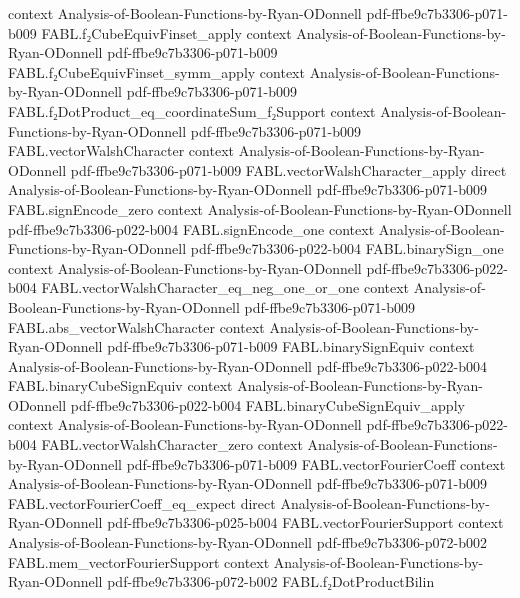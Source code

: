 \begin{theorem}
  {context}
  {Analysis-of-Boolean-Functions-by-Ryan-ODonnell}
  {pdf-ffbe9c7b3306-p071-b009}
\proofstep
  {FABL.f₂CubeEquivFinset_apply}
  {context}
  {Analysis-of-Boolean-Functions-by-Ryan-ODonnell}
  {pdf-ffbe9c7b3306-p071-b009}
\proofstep
  {FABL.f₂CubeEquivFinset_symm_apply}
  {context}
  {Analysis-of-Boolean-Functions-by-Ryan-ODonnell}
  {pdf-ffbe9c7b3306-p071-b009}
\proofstep
  {FABL.f₂DotProduct_eq_coordinateSum_f₂Support}
  {context}
  {Analysis-of-Boolean-Functions-by-Ryan-ODonnell}
  {pdf-ffbe9c7b3306-p071-b009}
\proofstep
  {FABL.vectorWalshCharacter}
  {context}
  {Analysis-of-Boolean-Functions-by-Ryan-ODonnell}
  {pdf-ffbe9c7b3306-p071-b009}
\proofstep
  {FABL.vectorWalshCharacter_apply}
  {direct}
  {Analysis-of-Boolean-Functions-by-Ryan-ODonnell}
  {pdf-ffbe9c7b3306-p071-b009}
\proofstep
  {FABL.signEncode_zero}
  {context}
  {Analysis-of-Boolean-Functions-by-Ryan-ODonnell}
  {pdf-ffbe9c7b3306-p022-b004}
\proofstep
  {FABL.signEncode_one}
  {context}
  {Analysis-of-Boolean-Functions-by-Ryan-ODonnell}
  {pdf-ffbe9c7b3306-p022-b004}
\proofstep
  {FABL.binarySign_one}
  {context}
  {Analysis-of-Boolean-Functions-by-Ryan-ODonnell}
  {pdf-ffbe9c7b3306-p022-b004}
\proofstep
  {FABL.vectorWalshCharacter_eq_neg_one_or_one}
  {context}
  {Analysis-of-Boolean-Functions-by-Ryan-ODonnell}
  {pdf-ffbe9c7b3306-p071-b009}
\proofstep
  {FABL.abs_vectorWalshCharacter}
  {context}
  {Analysis-of-Boolean-Functions-by-Ryan-ODonnell}
  {pdf-ffbe9c7b3306-p071-b009}
\proofstep
  {FABL.binarySignEquiv}
  {context}
  {Analysis-of-Boolean-Functions-by-Ryan-ODonnell}
  {pdf-ffbe9c7b3306-p022-b004}
\proofstep
  {FABL.binaryCubeSignEquiv}
  {context}
  {Analysis-of-Boolean-Functions-by-Ryan-ODonnell}
  {pdf-ffbe9c7b3306-p022-b004}
\proofstep
  {FABL.binaryCubeSignEquiv_apply}
  {context}
  {Analysis-of-Boolean-Functions-by-Ryan-ODonnell}
  {pdf-ffbe9c7b3306-p022-b004}
\proofstep
  {FABL.vectorWalshCharacter_zero}
  {context}
  {Analysis-of-Boolean-Functions-by-Ryan-ODonnell}
  {pdf-ffbe9c7b3306-p071-b009}
\proofstep
  {FABL.vectorFourierCoeff}
  {context}
  {Analysis-of-Boolean-Functions-by-Ryan-ODonnell}
  {pdf-ffbe9c7b3306-p071-b009}
\proofstep
  {FABL.vectorFourierCoeff_eq_expect}
  {direct}
  {Analysis-of-Boolean-Functions-by-Ryan-ODonnell}
  {pdf-ffbe9c7b3306-p025-b004}
\proofstep
  {FABL.vectorFourierSupport}
  {context}
  {Analysis-of-Boolean-Functions-by-Ryan-ODonnell}
  {pdf-ffbe9c7b3306-p072-b002}
\proofstep
  {FABL.mem_vectorFourierSupport}
  {context}
  {Analysis-of-Boolean-Functions-by-Ryan-ODonnell}
  {pdf-ffbe9c7b3306-p072-b002}
\proofstep
  {FABL.f₂DotProductBilin}

\end{theorem}
